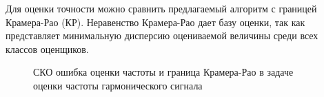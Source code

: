 Для оценки точности можно сравнить предлагаемый алгоритм с границей Крамера-Рао (КР). Неравенство Крамера-Рао дает базу оценки, так
как представляет минимальную дисперсию оцениваемой величины среди всех классов оценщиков.
\begin{figure}[H]
\center{}
	\caption{СКО ошибка оценки частоты и граница Крамера-Рао в задаче оценки частоты гармонического сигнала}
	\label{pic:crlb_vs_1sat_algo}
\end{figure}
